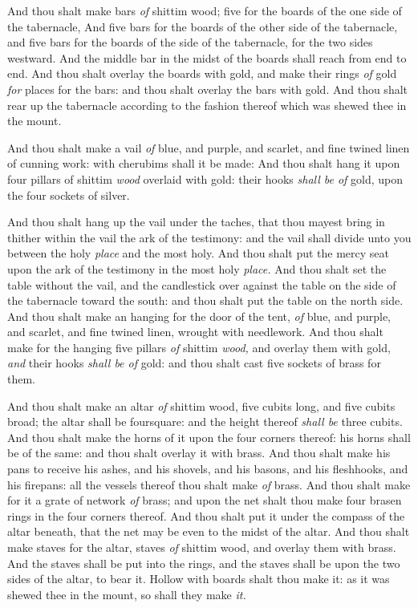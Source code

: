 \documentclass[11pt,letterpaper,oneside]{memoir}
\begin{document}
And thou shalt make bars \emph{of} shittim wood; five for the boards of
the one side of the tabernacle, And five bars for the boards of the
other side of the tabernacle, and five bars for the boards of the side
of the tabernacle, for the two sides westward. And the middle bar in the
midst of the boards shall reach from end to end. And thou shalt overlay
the boards with gold, and make their rings \emph{of} gold \emph{for}
places for the bars: and thou shalt overlay the bars with gold. And thou
shalt rear up the tabernacle according to the fashion thereof which was
shewed thee in the mount.

And thou shalt make a vail \emph{of} blue, and purple, and scarlet, and
fine twined linen of cunning work: with cherubims shall it be made: And
thou shalt hang it upon four pillars of shittim \emph{wood} overlaid
with gold: their hooks \emph{shall be of} gold, upon the four sockets of
silver.

And thou shalt hang up the vail under the taches, that thou mayest bring
in thither within the vail the ark of the testimony: and the vail shall
divide unto you between the holy \emph{place} and the most holy. And
thou shalt put the mercy seat upon the ark of the testimony in the most
holy \emph{place. }And thou shalt set the table without the vail, and
the candlestick over against the table on the side of the tabernacle
toward the south: and thou shalt put the table on the north side. And
thou shalt make an hanging for the door of the tent, \emph{of} blue, and
purple, and scarlet, and fine twined linen, wrought with needlework. And
thou shalt make for the hanging five pillars \emph{of} shittim
\emph{wood,} and overlay them with gold, \emph{and} their hooks
\emph{shall be of} gold: and thou shalt cast five sockets of brass for
them.

And thou shalt make an altar \emph{of} shittim wood, five cubits long,
and five cubits broad; the altar shall be foursquare: and the height
thereof \emph{shall be} three cubits. And thou shalt make the horns of
it upon the four corners thereof: his horns shall be of the same: and
thou shalt overlay it with brass. And thou shalt make his pans to
receive his ashes, and his shovels, and his basons, and his fleshhooks,
and his firepans: all the vessels thereof thou shalt make \emph{of}
brass. And thou shalt make for it a grate of network \emph{of} brass;
and upon the net shalt thou make four brasen rings in the four corners
thereof. And thou shalt put it under the compass of the altar beneath,
that the net may be even to the midst of the altar. And thou shalt make
staves for the altar, staves \emph{of} shittim wood, and overlay them
with brass. And the staves shall be put into the rings, and the staves
shall be upon the two sides of the altar, to bear it. Hollow with boards
shalt thou make it: as it was shewed thee in the mount, so shall they
make \emph{it.}
\end{document}
